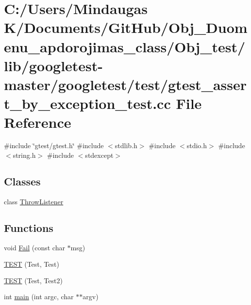 \hypertarget{_obj__test_2lib_2googletest-master_2googletest_2test_2gtest__assert__by__exception__test_8cc}{}\section{C\+:/\+Users/\+Mindaugas K/\+Documents/\+Git\+Hub/\+Obj\+\_\+\+Duomenu\+\_\+apdorojimas\+\_\+class/\+Obj\+\_\+test/lib/googletest-\/master/googletest/test/gtest\+\_\+assert\+\_\+by\+\_\+exception\+\_\+test.cc File Reference}
\label{_obj__test_2lib_2googletest-master_2googletest_2test_2gtest__assert__by__exception__test_8cc}
{\ttfamily \#include \char`\"{}gtest/gtest.\+h\char`\"{}}\newline
{\ttfamily \#include $<$stdlib.\+h$>$}\newline
{\ttfamily \#include $<$stdio.\+h$>$}\newline
{\ttfamily \#include $<$string.\+h$>$}\newline
{\ttfamily \#include $<$stdexcept$>$}\newline
\subsection*{Classes}
\begin{DoxyCompactItemize}
\item 
class \mbox{\hyperlink{class_throw_listener}{Throw\+Listener}}
\end{DoxyCompactItemize}
\subsection*{Functions}
\begin{DoxyCompactItemize}
\item 
void \mbox{\hyperlink{_obj__test_2lib_2googletest-master_2googletest_2test_2gtest__assert__by__exception__test_8cc_a78ecbe7682643ac0413d57d0b9f27fa6}{Fail}} (const char $\ast$msg)
\item 
\mbox{\hyperlink{_obj__test_2lib_2googletest-master_2googletest_2test_2gtest__assert__by__exception__test_8cc_abd54dc4a1b6e0bcd993f8acfabe13400}{T\+E\+ST}} (Test, Test)
\item 
\mbox{\hyperlink{_obj__test_2lib_2googletest-master_2googletest_2test_2gtest__assert__by__exception__test_8cc_a5a30210f18c6e07037bb61edc36ffc6c}{T\+E\+ST}} (Test, Test2)
\item 
int \mbox{\hyperlink{_obj__test_2lib_2googletest-master_2googletest_2test_2gtest__assert__by__exception__test_8cc_a3c04138a5bfe5d72780bb7e82a18e627}{main}} (int argc, char $\ast$$\ast$argv)
\end{DoxyCompactItemize}
